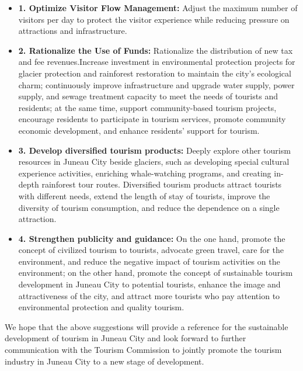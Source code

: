\documentclass{mcmthesis}
\begin{document}
\begin{itemize}
  \item \textbf{1. Optimize Visitor Flow Management: }{Adjust the maximum number of visitors per day to protect the visitor experience while reducing pressure on attractions and infrastructure.}
  \item \textbf{2. Rationalize the Use of Funds: }{Rationalize the distribution of new tax and fee revenues.Increase investment in environmental protection projects for glacier protection and rainforest restoration to maintain the city's ecological charm; continuously improve infrastructure and upgrade water supply, power supply, and sewage treatment capacity to meet the needs of tourists and residents; at the same time, support community-based tourism projects, encourage residents to participate in tourism services, promote community economic development, and enhance residents' support for tourism.}
  \item \textbf{3. Develop diversified tourism products: }{Deeply explore other tourism resources in Juneau City beside glaciers, such as developing special cultural experience activities, enriching whale-watching programs, and creating in-depth rainforest tour routes. Diversified tourism products attract tourists with different needs, extend the length of stay of tourists, improve the diversity of tourism consumption, and reduce the dependence on a single attraction.}
  \item \textbf{4. Strengthen publicity and guidance: }{On the one hand, promote the concept of civilized tourism to tourists, advocate green travel, care for the environment, and reduce the negative impact of tourism activities on the environment; on the other hand, promote the concept of sustainable tourism development in Juneau City to potential tourists, enhance the image and attractiveness of the city, and attract more tourists who pay attention to environmental protection and quality tourism.}
\end{itemize}

{We hope that the above suggestions will provide a reference for the sustainable development of tourism in Juneau City and look forward to further communication with the Tourism Commission to jointly promote the tourism industry in Juneau City to a new stage of development.}
\end{document}
